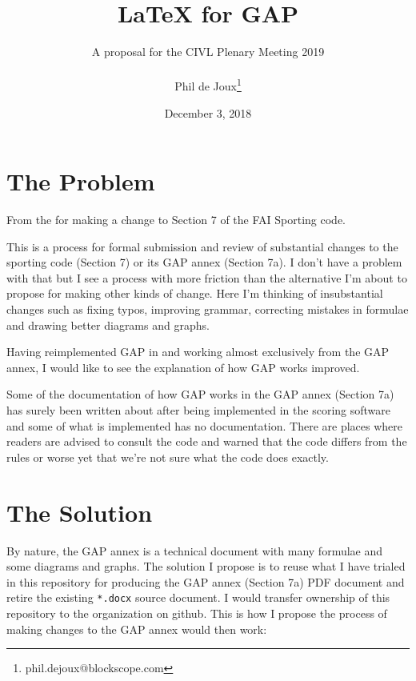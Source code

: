 \documentclass{article}
\title{LaTeX for GAP}
\date{December 3, 2018}
\author{A proposal for the CIVL Plenary Meeting 2019\\\\
Phil de Joux\thanks{phil.dejoux@blockscope.com}}
\begin{document}
\maketitle
\section{The Problem}


From the  for making a change to Section 7 of the FAI Sporting code.

This is a process for formal submission and review of substantial changes to
the sporting code (Section 7) or its GAP annex (Section 7a). I don't have
a problem with that but I see a process with more friction than the alternative
I'm about to propose for making other kinds of change. Here I'm thinking of
insubstantial changes such as fixing typos, improving grammar, correcting
mistakes in formulae and drawing better diagrams and graphs.

Having reimplemented GAP in
 and working
almost exclusively from the GAP annex, I would like to see the explanation of
how GAP works improved.

Some of the documentation of how GAP works in the GAP annex (Section 7a) has
surely been written about after being implemented in the scoring software and
some of what is implemented has no documentation.  There are places where
readers are advised to consult the code and warned that the code differs from
the rules or worse yet that we're not sure what the code does exactly.

\section{The Solution}

By nature, the GAP annex is a technical document with many formulae and some
diagrams and graphs. The solution I propose is to reuse what I have trialed in
this repository for producing the GAP annex (Section 7a) PDF document and
retire the existing \texttt{*.docx} source document. I would transfer ownership
of this repository to the 
organization on github. This is how I propose the process of making changes to
the GAP annex would then work:
\end{document}
